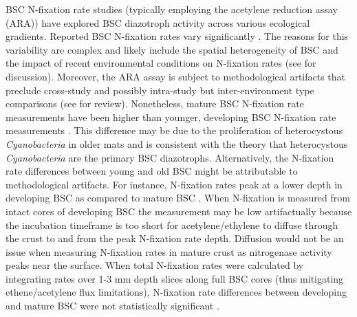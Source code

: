 BSC N-fixation rate studies (typically employing the acetylene
reduction assay (ARA)) have explored BSC diazotroph activity across
various ecological gradients. Reported BSC N-fixation rates vary
significantly \citep{Evans_2001}.  The reasons for this variability are
complex and likely include the spatial heterogeneity of BSC
\citep{Evans_2001} and the impact of recent environmental conditions on
N-fixation rates (see \citet{Belnap_2001} for discussion).  Moreover,
the ARA assay is subject to methodological artifacts that preclude
cross-study and possibly intra-study but inter-environment type
comparisons (see \citet{Belnap_2001} for review). Nonetheless, mature
BSC N-fixation rate measurements have been higher than younger,
developing BSC N-fixation rate measurements \citep{Belnap_2002,
14766579}. This difference may be due to the proliferation of
heterocystous \textit{Cyanobacteria} in older mats and is consistent
with the theory that heterocystous \textit{Cyanobacteria} are the
primary BSC diazotrophs.  Alternatively, the N-fixation rate
differences between young and old BSC might be attributable to
methodological artifacts.  For instance, N-fixation rates peak at a
lower depth in developing BSC as compared to mature BSC
\citep{15643930}. When N-fixation is measured from intact cores of
developing BSC the measurement may be low artifactually because the
incubation timeframe is too short for acetylene/ethylene to diffuse
through the crust to and from the peak N-fixation rate depth. Diffusion
would not be an issue when measuring N-fixation rates in mature crust
as nitrogenase activity peaks near the surface. When total N-fixation
rates were calculated by integrating rates over 1-3 mm depth slices
along full BSC cores (thus mitigating ethene/acetylene flux
limitations), N-fixation rate differences between developing and mature
BSC were not statistically significant \citep{15643930}.

